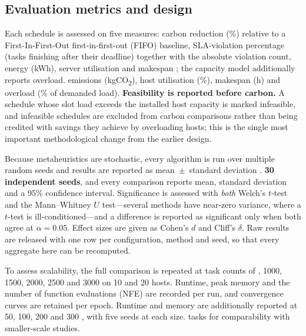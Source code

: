 \documentclass[12pt,a4paper]{article}
\providecommand{\DIFaddtex}[1]{{\protect\color{blue} \sf #1}} %
\providecommand{\DIFdeltex}[1]{{\protect\color{red} \scriptsize #1}} %
\providecommand{\DIFaddbegin}{} %
\providecommand{\DIFaddend}{} %
\providecommand{\DIFdelbegin}{} %
\providecommand{\DIFdelend}{} %
\providecommand{\DIFadd}[1]{\texorpdfstring{\DIFaddtex{#1}}{#1}} %
\providecommand{\DIFdel}[1]{\texorpdfstring{\DIFdeltex{#1}}{}} %
\providecommand{\DIFscaledelfig}{0.5}
\newlength{\DIFdelgraphicswidth} %
\newlength{\DIFdelgraphicsheight} %
\providecommand{\DIFaddincludegraphics}[2][]{{\color{blue}\fbox{\DIFOincludegraphics[#1]{#2}}}} %
\providecommand{\DIFdelincludegraphics}[2][]{%
\sbox{\DIFdelgraphicsbox}{\DIFOincludegraphics[#1]{#2}}%
\settoboxwidth{\DIFdelgraphicswidth}{\DIFdelgraphicsbox} %
\settoboxtotalheight{\DIFdelgraphicsheight}{\DIFdelgraphicsbox} %
\scalebox{\DIFscaledelfig}{%
\parbox[b]{\DIFdelgraphicswidth}{\usebox{\DIFdelgraphicsbox}\\[-\baselineskip] \rule{\DIFdelgraphicswidth}{0em}}\llap{\resizebox{\DIFdelgraphicswidth}{\DIFdelgraphicsheight}{%
\setlength{\unitlength}{\DIFdelgraphicswidth}%
\begin{picture}(1,1)%
\thicklines\linethickness{2pt} %
{\color[rgb]{1,0,0}\put(0,0){\framebox(1,1){}}}%
{\color[rgb]{1,0,0}\put(0,0){\line( 1,1){1}}}%
{\color[rgb]{1,0,0}\put(0,1){\line(1,-1){1}}}%
\end{picture}%
}\hspace*{3pt}}} %
} %
\DeclareRobustCommand{\DIFaddbegin}{\DIFOaddbegin \let\includegraphics\DIFaddincludegraphics} %
\DeclareRobustCommand{\DIFaddend}{\DIFOaddend \let\includegraphics\DIFOincludegraphics} %
\DeclareRobustCommand{\DIFdelbegin}{\DIFOdelbegin \let\includegraphics\DIFdelincludegraphics} %
\DeclareRobustCommand{\DIFdelend}{\DIFOaddend \let\includegraphics\DIFOincludegraphics} %
\begin{document}
\subsection{Evaluation metrics and design}
Each schedule is assessed on\DIFdelbegin \DIFdel{five measures}\DIFdelend : carbon reduction \DIFaddbegin \DIFadd{(\%) }\DIFaddend relative to a \DIFdelbegin \DIFdel{First-In-First-Out }\DIFdelend \DIFaddbegin \DIFadd{first-in-first-out }\DIFaddend (FIFO) baseline,
SLA-violation percentage (tasks finishing after their deadline) \DIFaddbegin \DIFadd{together with the absolute violation count}\DIFaddend ,
energy (kWh), \DIFdelbegin \DIFdel{server utilisation and
makespan ; the
capacity model additionally reports overload.
}\DIFdelend \DIFaddbegin \DIFadd{emissions (kgCO\textsubscript{2}), host utilisation (\%), makespan (h) and overload (\% of
demanded load). \textbf{Feasibility is reported before carbon.} A schedule whose slot load exceeds the
installed host capacity is marked infeasible, and infeasible schedules are excluded from carbon comparisons
rather than being credited with savings they achieve by overloading hosts; this is the single most important
methodological change from the earlier design.
}

\DIFaddend Because metaheuristics are stochastic, every algorithm is run over \DIFdelbegin \DIFdel{multiple random seeds and results are reported as mean~$\pm$~standard deviation . }\DIFdelend \DIFaddbegin \DIFadd{\textbf{30 independent seeds}, and every
comparison reports mean, standard deviation and a 95\% confidence interval. Significance is assessed with
\emph{both} Welch's $t$-test and the Mann--Whitney $U$ test---several methods have near-zero variance, where a
$t$-test is ill-conditioned---and a difference is reported as significant only when both agree at
$\alpha=0.05$. Effect sizes are given as Cohen's $d$ and Cliff's $\delta$. Raw results are released with one
row per configuration, method and seed, so that every aggregate here can be recomputed.
}

\DIFaddend To assess scalability, the full comparison is repeated at task counts of \DIFaddbegin \DIFadd{500, 1000, 1500, 2000, 2500 and 3000
on 10 and 20 hosts. Runtime, peak memory and the number of function evaluations (NFE) are recorded per run,
and convergence curves are retained per epoch. Runtime and memory are additionally reported at }\DIFaddend 50, 100, 200
and 300 \DIFdelbegin \DIFdel{, with five seeds at
each size.
}\DIFdelend \DIFaddbegin \DIFadd{tasks for comparability with smaller-scale studies.
}
\end{document}
